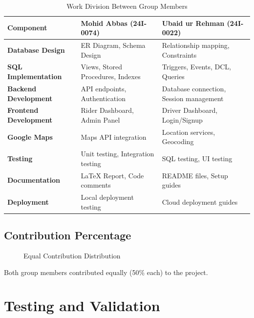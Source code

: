 \documentclass[12pt,a4paper]{report}
\begin{document}
\begin{table}[H]
\centering
\caption{Work Division Between Group Members}
\begin{tabular}{|p{4cm}|p{5cm}|p{5cm}|}
\hline
\textbf{Component} & \textbf{Mohid Abbas (24I-0074)} & \textbf{Ubaid ur Rehman (24I-0022)} \\
\hline
\textbf{Database Design} & ER Diagram, Schema Design & Relationship mapping, Constraints \\
\hline
\textbf{SQL Implementation} & Views, Stored Procedures, Indexes & Triggers, Events, DCL, Queries \\
\hline
\textbf{Backend Development} & API endpoints, Authentication & Database connection, Session management \\
\hline
\textbf{Frontend Development} & Rider Dashboard, Admin Panel & Driver Dashboard, Login/Signup \\
\hline
\textbf{Google Maps} & Maps API integration & Location services, Geocoding \\
\hline
\textbf{Testing} & Unit testing, Integration testing & SQL testing, UI testing \\
\hline
\textbf{Documentation} & LaTeX Report, Code comments & README files, Setup guides \\
\hline
\textbf{Deployment} & Local deployment testing & Cloud deployment guides \\
\hline
\end{tabular}
\end{table}

\section{Contribution Percentage}

\begin{figure}[H]
    \centering
    \caption{Equal Contribution Distribution}
    \label{fig:contribution}
\end{figure}

Both group members contributed equally (50\% each) to the project.

\chapter{Testing and Validation}
\end{document}
